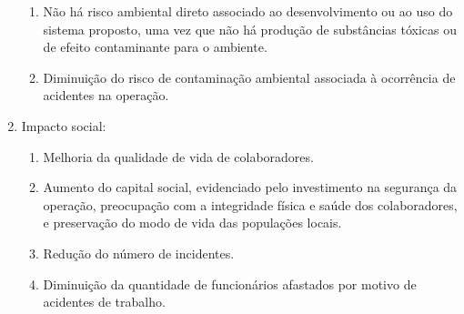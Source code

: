 \begin{enumerate}
\begin{enumerate}
			\item Não há risco ambiental direto associado ao desenvolvimento ou ao uso do sistema proposto, uma vez que não há produção de substâncias tóxicas ou de efeito contaminante para o ambiente.
			\item Diminuição do risco de contaminação ambiental associada à ocorrência de acidentes na operação.  
		\end{enumerate}
	\item Impacto social:
		\begin{enumerate}
			\item Melhoria da qualidade de vida de colaboradores.
			\item Aumento do capital social, evidenciado pelo investimento na segurança da operação, preocupação com a integridade física e saúde dos colaboradores, e preservação do modo de vida das populações locais.
			\item Redução do número de incidentes.
			\item Diminuição da quantidade de funcionários afastados por motivo de acidentes de trabalho.
		\end{enumerate}
\end{enumerate}
